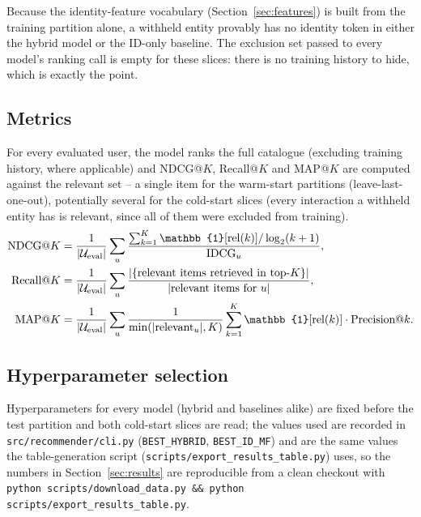 Because the identity-feature vocabulary (Section~\ref{sec:features}) is
built from the training partition alone, a withheld entity provably has no
identity token in either the hybrid model or the ID-only baseline. The
exclusion set passed to every model's ranking call is empty for these
slices: there is no training history to hide, which is exactly the point.

\subsection{Metrics}

For every evaluated user, the model ranks the full catalogue (excluding
training history, where applicable) and NDCG@$K$, Recall@$K$ and MAP@$K$ are
computed against the relevant set -- a single item for the warm-start
partitions (leave-last-one-out), potentially several for the cold-start
slices (every interaction a withheld entity has is relevant, since all of
them were excluded from training).
\begin{align}
  \text{NDCG@}K &= \frac{1}{|\Uset_{\text{eval}}|} \sum_{u}
    \frac{\sum_{k=1}^{K} \mathbb{1}[\text{rel}(k)] / \log_2(k+1)}{\text{IDCG}_u} , \\
  \text{Recall@}K &= \frac{1}{|\Uset_{\text{eval}}|} \sum_{u}
    \frac{|\{\text{relevant items retrieved in top-}K\}|}{|\text{relevant items for } u|} , \\
  \text{MAP@}K &= \frac{1}{|\Uset_{\text{eval}}|} \sum_{u}
    \frac{1}{\min(|\text{relevant}_u|, K)} \sum_{k=1}^{K} \mathbb{1}[\text{rel}(k)] \cdot \text{Precision@}k .
\end{align}

\subsection{Hyperparameter selection}

Hyperparameters for every model (hybrid and baselines alike) are fixed
before the test partition and both cold-start slices are read; the values
used are recorded in \texttt{src/recommender/cli.py}
(\texttt{BEST\_HYBRID}, \texttt{BEST\_ID\_MF}) and are the same values the
table-generation script (\texttt{scripts/export\_results\_table.py}) uses,
so the numbers in Section~\ref{sec:results} are reproducible from a clean
checkout with \texttt{python scripts/download\_data.py \&\& python
scripts/export\_results\_table.py}.
